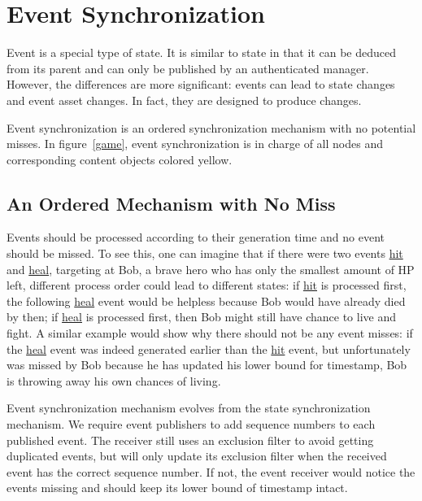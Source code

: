 \section{Event Synchronization}
\label{eventsync}
Event is a special type of state. It is similar to state in that it can be deduced from its parent and can only be published by an authenticated manager. %
However, the differences are more significant: events can lead to state changes and event asset changes. In fact, they are designed to produce changes.

Event synchronization is an ordered synchronization mechanism with no potential misses. In figure~\ref{game}, event synchronization is in charge of all nodes and corresponding content objects colored yellow.


\subsection{An Ordered Mechanism with No Miss}
Events should be processed according to their generation time and no event should be missed. To see this, one can imagine that if there were two events \url{hit} and \url{heal}, targeting at Bob, a brave hero who has only the smallest amount of HP left, different process order could lead to different states: if \url{hit} is processed first, the following \url{heal} event would be helpless because Bob would have already died by then; if \url{heal} is processed first, then Bob might still have chance to live and fight. A similar example would show why there should not be any event misses: if the \url{heal} event was indeed generated earlier than the \url{hit} event, but unfortunately was missed by Bob because he has updated his lower bound for timestamp, Bob is throwing away his own chances of living.


Event synchronization mechanism evolves from the state synchronization mechanism. We require event publishers to add sequence numbers to each published event. The receiver still uses an exclusion filter to avoid getting duplicated events, but will only update its exclusion filter when the received event has the correct sequence number. If not, the event receiver would notice the events missing and should keep its lower bound of timestamp intact.

